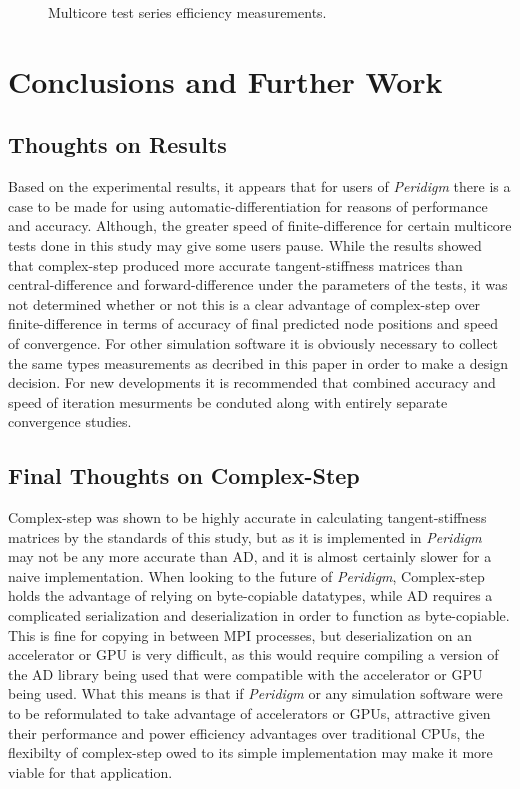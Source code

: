 \documentclass[preprint,12pt]{elsarticle}
\begin{document}
\begin{figure}[h]
  \centering
  \scalebox{.7}{}
  \caption{Multicore test series efficiency measurements.}
  \label{fig:multi_efficiency}
\end{figure}

\section{Conclusions and Further Work}

\subsection{Thoughts on Results} Based on the experimental results, it appears that for users of
\emph{Peridigm} there is a case to be made for using automatic-differentiation for reasons of
performance and accuracy. Although, the greater speed of finite-difference for certain multicore
tests done in this study may give some users pause. While the results showed that complex-step
produced more accurate tangent-stiffness matrices than central-difference and forward-difference 
under the parameters of the tests, it was not determined whether or not this is a clear advantage of complex-step over
finite-difference in terms of accuracy of final predicted node positions and speed of convergence. For other
simulation software it is obviously necessary to collect the same types measurements as decribed in
this paper in order to make a design decision. For new developments it is recommended that combined
accuracy and speed of iteration mesurments be conduted along with entirely separate convergence
studies. 

\subsection{Final Thoughts on Complex-Step} Complex-step was shown to be highly accurate in
calculating tangent-stiffness matrices by the standards of this study, but as it is implemented in
\emph{Peridigm} may not be any more accurate than AD, and it is almost certainly slower for a naive
implementation. When looking to the future of \emph{Peridigm}, Complex-step holds the advantage of
relying on byte-copiable datatypes, while AD requires a complicated serialization and
deserialization in order to function as byte-copiable. This is fine for copying in between MPI
processes, but deserialization on an accelerator or GPU is very difficult, as this would require
compiling a version of the AD library being used that were compatible with the accelerator or GPU
being used. What this means is that if \emph{Peridigm} or any simulation software were to be
reformulated to take advantage of accelerators or GPUs, attractive given their performance and power
efficiency advantages over traditional CPUs, the flexibilty of complex-step owed to its simple
implementation may make it more viable for that application.
\end{document}

